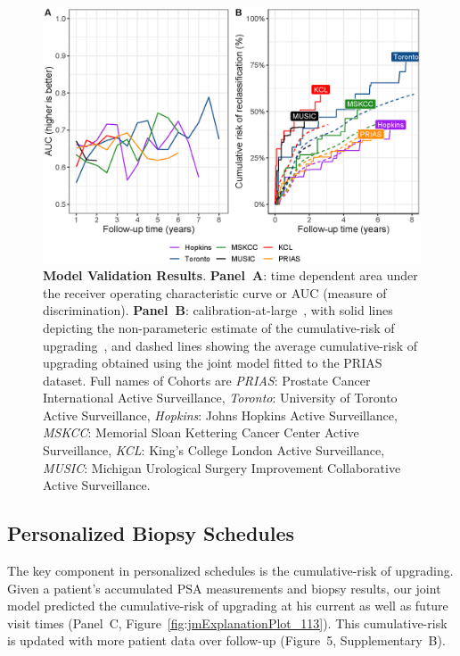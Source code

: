 \begin{figure}
\centerline{\includegraphics[width=\columnwidth]{images/auc_beforecalib.eps}}
\caption{\textbf{Model Validation Results}. \textbf{Panel~A}: time dependent area under the receiver operating characteristic curve or AUC (measure of discrimination). \textbf{Panel~B}: calibration-at-large~\citep{royston2013external,steyerberg2010assessing}, with solid lines depicting the non-parameteric estimate of the cumulative-risk of upgrading~\citep{turnbull1976empirical}, and dashed lines showing the average cumulative-risk of upgrading obtained using the joint model fitted to the PRIAS dataset. Full names of Cohorts are \textit{PRIAS}: Prostate Cancer International Active Surveillance, \textit{Toronto}: University of Toronto Active Surveillance, \textit{Hopkins}: Johns Hopkins Active Surveillance, \textit{MSKCC}: Memorial Sloan Kettering Cancer Center Active Surveillance, \textit{KCL}: King's College London Active Surveillance, \textit{MUSIC}: Michigan Urological Surgery Improvement Collaborative Active Surveillance.}
\label{fig:auc_beforecalib}
\end{figure}

\subsection{Personalized Biopsy Schedules}

The key component in personalized schedules is the cumulative-risk of upgrading. Given a patient's accumulated PSA measurements and biopsy results, our joint model predicted the cumulative-risk of upgrading at his current as well as future visit times (Panel~C, Figure~\ref{fig:jmExplanationPlot_113}). This cumulative-risk is updated with more patient data over follow-up (Figure~5, Supplementary~B).

